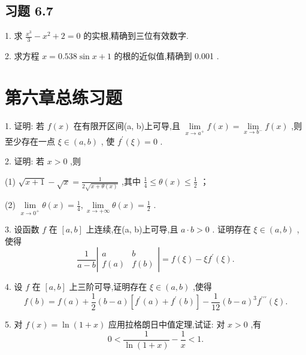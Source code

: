 \subsection{习题 6.7}

1. 求 \(\frac{{x}^{3}}{3} - {x}^{2} + 2 = 0\) 的实根,精确到三位有效数字.

2. 求方程 \(x = {0.538}\sin x + 1\) 的根的近似值,精确到 0.001 .

\section{第六章总练习题}

1. 证明: 若 \(f\left( x\right)\) 在有限开区间(a, b)上可导,且 \(\mathop{\lim }\limits_{{x \rightarrow  {a}^{ + }}}f\left( x\right)  = \mathop{\lim }\limits_{{x \rightarrow  {b}^{ - }}}f\left( x\right)\) ,则至少存在一点 \(\xi  \in  \left( {a,b}\right)\) , 使 \({f}^{\prime }\left( \xi \right)  = 0\) .

2. 证明: 若 \(x > 0\) ,则

(1) \(\sqrt{x + 1} - \sqrt{x} = \frac{1}{2\sqrt{x + \theta \left( x\right) }}\) ,其中 \(\frac{1}{4} \leq  \theta \left( x\right)  \leq  \frac{1}{2}\) ；

(2) \(\mathop{\lim }\limits_{{x \rightarrow  {0}^{ + }}}\theta \left( x\right)  = \frac{1}{4},\mathop{\lim }\limits_{{x \rightarrow   + \infty }}\theta \left( x\right)  = \frac{1}{2}\) .

3. 设函数 \(f\) 在 \(\left\lbrack  {a,b}\right\rbrack\) 上连续,在(a, b)上可导,且 \(a \cdot  b > 0\) . 证明存在 \(\xi  \in  \left( {a,b}\right)\) ,使得
\[
\frac{1}{a - b}\left| \begin{matrix} a & b \\  f\left( a\right) & f\left( b\right)  \end{matrix}\right|  = f\left( \xi \right)  - \xi {f}^{\prime }\left( \xi \right) .
\]

4. 设 \(f\) 在 \(\left\lbrack  {a,b}\right\rbrack\) 上三阶可导,证明存在 \(\xi  \in  \left( {a,b}\right)\) ,使得
\[
f\left( b\right)  = f\left( a\right)  + \frac{1}{2}\left( {b - a}\right) \left\lbrack  {{f}^{\prime }\left( a\right)  + {f}^{\prime }\left( b\right) }\right\rbrack   - \frac{1}{12}{\left( b - a\right) }^{3}{f}^{\prime \prime \prime }\left( \xi \right) .
\]

5. 对 \(f\left( x\right)  = \ln \left( {1 + x}\right)\) 应用拉格朗日中值定理,试证: 对 \(x > 0\) ,有
\[
0 < \frac{1}{\ln \left( {1 + x}\right) } - \frac{1}{x} < 1.
\]


